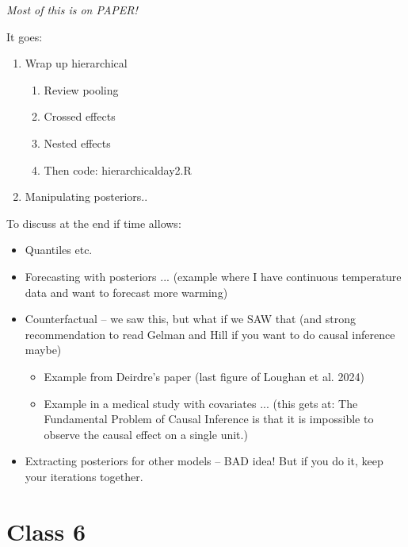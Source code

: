 \documentclass[11pt]{article}
\begin{document}

\emph{Most of this is on PAPER!} 

It goes:
\begin{enumerate}
\item Wrap up hierarchical 
\begin{enumerate}
\item Review pooling 
\item Crossed effects
\item Nested effects
\item Then code: hierarchicalday2.R
\end{enumerate}
\item Manipulating posteriors..
\end{enumerate}


To discuss at the end if time allows:
\begin{itemize}
\item Quantiles etc.
\item Forecasting with posteriors ... (example where I have continuous temperature data and want to forecast more warming)
\item Counterfactual -- we saw this, but what if we SAW that (and strong recommendation to read Gelman and Hill if you want to do causal inference maybe) 
\begin{itemize}
\item Example from Deirdre's paper (last figure of Loughan et al. 2024)
\item Example in a medical study with covariates ... (this gets at: The Fundamental Problem of Causal Inference is that it is impossible to observe the causal effect on a single unit.)
\end{itemize}
\item Extracting posteriors for other models -- BAD idea! But if you do it, keep your iterations together.
\end{itemize}



\newpage
\section{Class 6} 

\iffalse
- PREP Retrodictive check code for Deirdre data -- no grouping model (RStan), do retrodictive, then add grouping and try again (OR use the workflow example from Heather's model!)
- Prep math from phylo model
- Prep math from simplified trait model
- Prep math for mixture (use U Toronto) notation ... `unsupervised learning'
\fi
\end{document}
